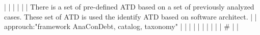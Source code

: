|    |            |      |                                                                      |                                                                                                                                                                          | There is a set of pre-defined ATD based on a set of previously analyzed cases. These set of ATD is used the identify ATD based on software architect.                                                                                                      |                                                                                                                                                                                                                                                                      |  approuch:"framework AnaConDebt, catalog, taxonomy"                                                                                                                                                                                                                                                      |                                                                                                                                                                                                                                                                                                                                                                                                                                                                                              |
|    |            |      |                                                                      |                                                                                                                                                                          |                                                                                                                                                                                                                                                            |                                                                                                                                                                                                                                                                      |  #                                                                                                                                                                                                                                                                                                       |                                                                                                                                                                                                                                                                                                                                                                                                                                                                                              |
